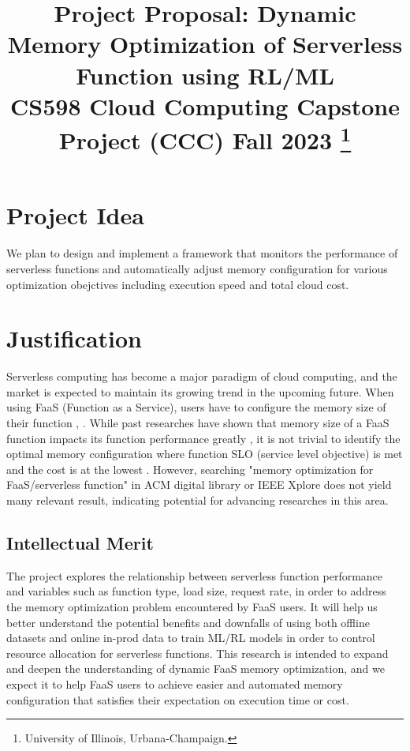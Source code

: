 \documentclass[conference]{IEEEtran}
\begin{document}
\title{Project Proposal: Dynamic Memory Optimization of Serverless Function using RL/ML\\
{\footnotesize CS598 Cloud Computing Capstone Project (CCC) Fall 2023}
\thanks{University of Illinois, Urbana-Champaign.}
}

\author{
\and
{}
\and
{}
}

\maketitle

\section{Project Idea}
We plan to design and implement a framework that monitors the performance of serverless functions and automatically adjust memory configuration for various optimization obejctives including execution speed and total cloud cost.

\section{Justification}
Serverless computing has become a major paradigm of cloud computing, and the market is expected to maintain its growing trend in the upcoming future. When using FaaS (Function as a Service), users have to configure the memory size of their function \cite{aws-lambda}, \cite{10.1145/3429880.3430094}. While past researches have shown that memory size of a FaaS function impacts its function performance greatly \cite{10.1145/3464298.3493398}, it is not trivial to identify the optimal memory configuration where function SLO (service level objective) is met and the cost is at the lowest \cite{9860980}. However, searching "memory optimization for FaaS/serverless function" in ACM digital library or IEEE Xplore does not yield many relevant result, indicating potential for advancing researches in this area. 

\subsection{Intellectual Merit}
The project explores the relationship between serverless function performance and variables such as function type, load size, request rate, in order to address the memory optimization problem encountered by FaaS users. It will help us better understand the potential benefits and downfalls of using both offline datasets and online in-prod data to train ML/RL models in order to control resource allocation for serverless functions. This research is intended to expand and deepen the understanding of dynamic FaaS memory optimization, and we expect it to help FaaS users to achieve easier and automated memory configuration that satisfies their expectation on execution time or cost.
\end{document}
